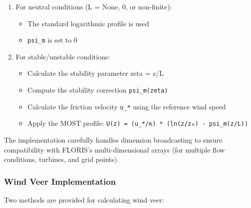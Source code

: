\documentclass{article}
\begin{document}
\begin{enumerate}[label=\arabic*.]
\item
  For neutral conditions (L = None, 0, or non-finite):

  \begin{itemize}[label=\textbullet]
  \item
    The standard logarithmic profile is used
  \item
    \texttt{psi\_m} is set to 0
  \end{itemize}
\item
  For stable/unstable conditions:

  \begin{itemize}[label=\textbullet]
  \item
    Calculate the stability parameter zeta = z/L
  \item
    Compute the stability correction \texttt{psi\_m(zeta)}
  \item
    Calculate the friction velocity \texttt{u\_*} using the reference
    wind speed
  \item
    Apply the MOST profile:
    \texttt{U(z)\ =\ (u\_*/κ)\ *\ (ln(z/z₀)\ -\ psi\_m(z/L))}
  \end{itemize}
\end{enumerate}

The implementation carefully handles dimension broadcasting to ensure
compatibility with FLORIS's multi-dimensional arrays (for multiple flow
conditions, turbines, and grid points).

\hypertarget{wind-veer-implementation}{%
\subsubsection{Wind Veer
Implementation}\label{wind-veer-implementation}}

Two methods are provided for calculating wind veer:
\end{document}
